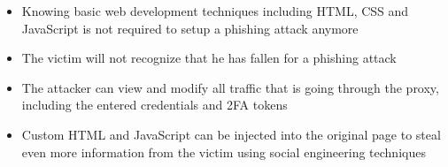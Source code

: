\documentclass[12pt]{scrbook}
\begin{document}
  \begin{itemize} \item Knowing basic web development techniques including HTML,
    CSS and JavaScript is not required to setup a phishing attack anymore

    \item The victim will not recognize that he has fallen for a phishing attack

    \item The attacker can view and modify all traffic that is going through the
      proxy, including the entered credentials and 2FA tokens

  \item Custom HTML and JavaScript can be injected into the original page to
steal even more information from the victim using social engineering techniques
\end{itemize}
\end{document}
